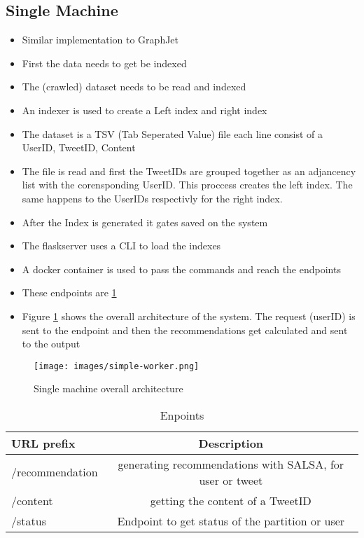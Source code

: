 \subsection{Single Machine}
\label{Single Machine}

\begin{itemize}
	\item Similar implementation to GraphJet
	\item First the data needs to get be indexed
	\item The (crawled) dataset needs to be read and indexed 
	\item An indexer is used to create a Left index and right index
	\item The dataset is a TSV (Tab Seperated Value) file each line consist of a UserID, TweetID, Content
	\item The file is read and first the TweetIDs are grouped together as an adjancency list with the corensponding UserID. This proccess creates the left index. The same happens to the UserIDs respectivly for the right index.
	\item After the Index is generated it gates saved on the system
	\item The flaskserver uses a CLI to load the indexes
	\item A docker container is used to pass the commands and reach the endpoints
	\item These endpoints are \ref{tab:endpoints}
	\item Figure \ref{fig:single-machine-architecture} shows the overall architecture of the system. The request (userID) is sent to the endpoint and then the recommendations get calculated and sent to the output
\end{itemize}

\begin{figure}[!ht]
	\centering
	\texttt{[image: images/simple-worker.png]}
	\caption{Single machine overall architecture}
	\label{fig:single-machine-architecture}
\end{figure}

\begin{table}[!h]
	\centering
	\caption{Enpoints}
	\label{tab:endpoints}
	\begin{tabular}{|l|c|}
		\hline
		\textbf{URL prefix} & \textbf{Description} \\
		\hline
		/recommendation & generating recommendations with SALSA, for user or tweet \\
		\hline
		/content & getting the content of a TweetID \\
		\hline
		/status & Endpoint to get status of the partition or user \\
		\hline
	\end{tabular}
\end{table}


